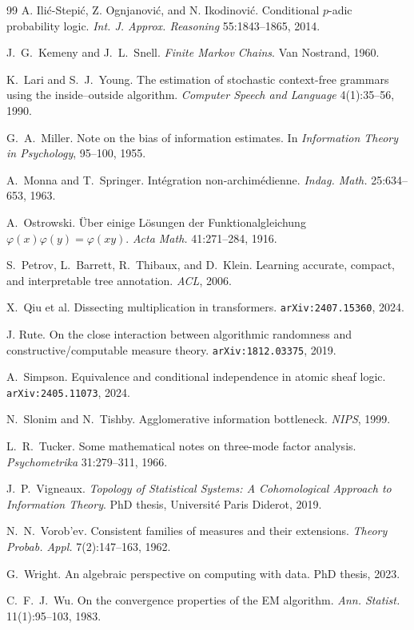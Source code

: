 \begin{thebibliography}{99}
 A. Ili\'c-Stepi\'c, Z. Ognjanovi\'c, and N. Ikodinovi\'c.
  Conditional $p$-adic probability logic. \emph{Int. J. Approx. Reasoning}
  55:1843--1865, 2014.

 J.~G.~Kemeny and J.~L.~Snell. \emph{Finite Markov Chains}.
  Van Nostrand, 1960.

 K.~Lari and S.~J.~Young. The estimation of stochastic
  context-free grammars using the inside--outside algorithm.
  \emph{Computer Speech and Language} 4(1):35--56, 1990.

 G.~A.~Miller. Note on the bias of information estimates.
  In \emph{Information Theory in Psychology}, 95--100, 1955.

 A.~Monna and T.~Springer. Int\'egration non-archim\'edienne.
  \emph{Indag. Math.} 25:634--653, 1963.

 A.~Ostrowski. \"Uber einige L\"osungen der
  Funktionalgleichung $\varphi(x)\varphi(y)=\varphi(xy)$.
  \emph{Acta Math.} 41:271--284, 1916.

 S.~Petrov, L.~Barrett, R.~Thibaux, and D.~Klein. Learning
  accurate, compact, and interpretable tree annotation. \emph{ACL}, 2006.

 X.~Qiu et al. Dissecting multiplication in transformers.
  \texttt{arXiv:2407.15360}, 2024.

 J. Rute. On the close interaction between algorithmic
  randomness and constructive/computable measure theory.
  \texttt{arXiv:1812.03375}, 2019.

 A.~Simpson. Equivalence and conditional independence in
  atomic sheaf logic. \texttt{arXiv:2405.11073}, 2024.

 N.~Slonim and N.~Tishby. Agglomerative information
  bottleneck. \emph{NIPS}, 1999.

 L.~R.~Tucker. Some mathematical notes on three-mode factor
  analysis. \emph{Psychometrika} 31:279--311, 1966.

 J.~P.~Vigneaux. \emph{Topology of Statistical Systems: A
  Cohomological Approach to Information Theory}. PhD thesis, Universit\'e Paris
  Diderot, 2019.

 N.~N.~Vorob'ev. Consistent families of measures and their
  extensions. \emph{Theory Probab. Appl.} 7(2):147--163, 1962.

 G.~Wright. An algebraic perspective on computing with
  data. PhD thesis, 2023.

 C.~F.~J.~Wu. On the convergence properties of the EM
  algorithm. \emph{Ann. Statist.} 11(1):95--103, 1983.

\end{thebibliography}
